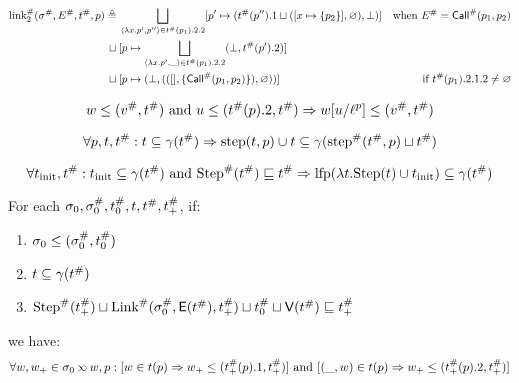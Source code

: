 \documentclass{article}
\begin{document}
\begin{align*}
	{\text{link}}^{\#}_2({\sigma}^{\#},{E}^{\#},{t}^{\#},p) \triangleq & \: \bigsqcup_{\langle\lambda x.p',p''\rangle\in{t}^{\#}(p_1).2.2}[p'\mapsto({t}^{\#}(p'').1\sqcup([x\mapsto\{p_2\}],\varnothing),\bot)] & \text{when }{E}^{\#}={\textsf{Call}}^{\#}(p_1,p_2)     \\
	\sqcup                                                   & \: [p\mapsto\bigsqcup_{\langle\lambda x.p',\_\rangle\in{t}^{\#}(p_1).2.2}(\bot,{t}^{\#}(p').2)]                                                                                          \\
	\sqcup                                                   & \: [p\mapsto(\bot,(([],\{{\textsf{Call}}^{\#}(p_1,p_2)\}),\varnothing))]                                                                              & \text{if }{t}^{\#}(p_1).2.1.2\neq\varnothing
\end{align*}
\begin{lem}
	\[w\le({v}^{\#},{t}^{\#})\text{ and }u\le({t}^{\#}(p).2,{t}^{\#})\Rightarrow w[u/{\ell}^{p}]\le({v}^{\#},{t}^{\#})\]
\end{lem}
\begin{lem}
	\[\forall p,t,{t}^{\#}:t\subseteq\gamma({t}^{\#})\Rightarrow\text{step}(t,p)\cup t\subseteq\gamma({\text{step}}^{\#}({t}^{\#},p)\sqcup{t}^{\#})\]
\end{lem}
\begin{lem}
	\[\forall t_{\text{init}},{t}^{\#}:t_{\text{init}}\subseteq\gamma({t}^{\#})\text{ and }{\text{Step}}^{\#}({t}^{\#})\sqsubseteq{t}^{\#}\Rightarrow\text{lfp}(\lambda t.\text{Step}(t)\cup t_{\text{init}})\subseteq\gamma({t}^{\#})\]
\end{lem}
\begin{lem}
	For each $\sigma_0,{\sigma}^{\#}_0,{t}^{\#}_0,t,{t}^{\#},{t}^{\#}_+$, if:

	\begin{enumerate}
		\item$\sigma_0\le({\sigma}^{\#}_0,{t}^{\#}_0)$
		\item$t\subseteq\gamma({t}^{\#})$
		\item${\text{Step}}^{\#}({t}^{\#}_+)\sqcup{\text{Link}}^{\#}({\sigma}^{\#}_0,\mathsf{E}({t}^{\#}),{t}^{\#}_+)\sqcup{t}^{\#}_0\sqcup\mathsf{V}({t}^{\#})\sqsubseteq{t}^{\#}_+$
	\end{enumerate}
	we have:
	\[\forall w,w_+\in\ctx_0\semlink w,p:[w\in\ptree(p)\Rightarrow w_+\le(\Abs\ptree_+(p).1,\Abs\ptree_+)]\text{ and }[(\_,w)\in\ptree(p)\Rightarrow w_+\le(\Abs\ptree_+(p).2,\Abs\ptree_+)]\]
\end{lem}
\end{document}

